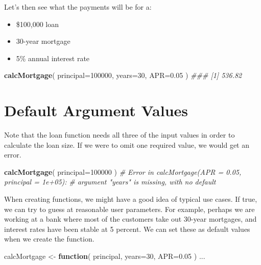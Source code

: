 \documentclass[]{book}
\newenvironment{Shaded}{\begin{snugshade}}{\end{snugshade}}
\newcommand{\CommentTok}[1]{\textcolor[rgb]{0.56,0.35,0.01}{\textit{#1}}}
\newcommand{\ControlFlowTok}[1]{\textcolor[rgb]{0.13,0.29,0.53}{\textbf{#1}}}
\newcommand{\DataTypeTok}[1]{\textcolor[rgb]{0.13,0.29,0.53}{#1}}
\newcommand{\DecValTok}[1]{\textcolor[rgb]{0.00,0.00,0.81}{#1}}
\newcommand{\FloatTok}[1]{\textcolor[rgb]{0.00,0.00,0.81}{#1}}
\newcommand{\KeywordTok}[1]{\textcolor[rgb]{0.13,0.29,0.53}{\textbf{#1}}}
\newcommand{\NormalTok}[1]{#1}
\newcommand{\StringTok}[1]{\textcolor[rgb]{0.31,0.60,0.02}{#1}}
\providecommand{\tightlist}{%
  \setlength{\itemsep}{0pt}\setlength{\parskip}{0pt}}
\theoremstyle{definition}
\theoremstyle{definition}
\theoremstyle{definition}
\theoremstyle{remark}
\begin{document}
Let's then see what the payments will be for a:

\begin{itemize}
\tightlist
\item
  \$100,000 loan
\item
  30-year mortgage
\item
  5\% annual interest rate
\end{itemize}

\begin{Shaded}
\begin{Highlighting}[]
\KeywordTok{calcMortgage}\NormalTok{( }\DataTypeTok{principal=}\DecValTok{100000}\NormalTok{, }\DataTypeTok{years=}\DecValTok{30}\NormalTok{, }\DataTypeTok{APR=}\FloatTok{0.05}\NormalTok{  )}
\CommentTok{### [1] 536.82}
\end{Highlighting}
\end{Shaded}

\hypertarget{default-argument-values}{%
\section{Default Argument Values}\label{default-argument-values}}

Note that the loan function needs all three of the input values in order
to calculate the loan size. If we were to omit one required value, we
would get an error.

\begin{Shaded}
\begin{Highlighting}[]
\KeywordTok{calcMortgage}\NormalTok{( }\DataTypeTok{principal=}\DecValTok{100000}\NormalTok{  )}
\CommentTok{# Error in calcMortgage(APR = 0.05, principal = 1e+05):  }
\CommentTok{#  argument "years" is missing, with no default }
\end{Highlighting}
\end{Shaded}

When creating functions, we might have a good idea of typical use cases.
If true, we can try to guess at reasonable user parameters. For example,
perhaps we are working at a bank where most of the customers take out
30-year mortgages, and interest rates have been stable at 5 percent. We
can set these as default values when we create the function.

\begin{Shaded}
\begin{Highlighting}[]
\NormalTok{   calcMortgage <-}\StringTok{ }\ControlFlowTok{function}\NormalTok{( principal, }\DataTypeTok{years=}\DecValTok{30}\NormalTok{, }\DataTypeTok{APR=}\FloatTok{0.05}\NormalTok{ )}
\NormalTok{   ...}
\end{Highlighting}
\end{Shaded}
\end{document}
